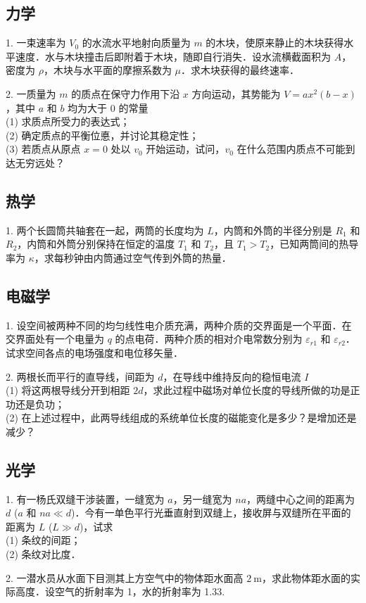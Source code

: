 \subsection{力学}
1. 一束速率为 $V_{0}$ 的水流水平地射向质量为 $m$ 的木块，使原来静止的木块获得水平速度．水与木块撞击后即附着于木块，随即自行消失．设水流横截面积为 $A$，密度为 $\rho$，木块与水平面的摩擦系数为 $\mu$．求木块获得的最终速率．

2. 一质量为 $m$ 的质点在保守力作用下沿 $x$ 方向运动，其势能为 $V=a x^{2}(b-x)$，其中 $a$ 和 $b$ 均为大于 0 的常量\\
(1) 求质点所受力的表达式；\\
(2) 确定质点的平衡位悳，并讨论其稳定性；\\
(3) 若质点从原点 $x=0$ 处以 $v_{0}$ 开始运动，试问，$v_{0}$ 在什么范围内质点不可能到达无穷远处？
\subsection{热学}
1. 两个长圆筒共轴套在一起，两筒的长度均为 $L$，内筒和外筒的半径分别是 $R_{1}$ 和 $R_{2}$，内筒和外筒分别保持在恒定的温度 $T_{1}$ 和 $T_{2}$，且 $T_{1}>T_{2}$，已知两筒间的热导率为 $\kappa$，求每秒钟由内筒通过空气传到外筒的热量．
\subsection{电磁学}
1. 设空间被两种不同的均匀线性电介质充满，两种介质的交界面是一个平面．在交界面处有一个电量为 $q$ 的点电荷．两种介质的相对介电常数分别为 $\varepsilon_{r 1}$ 和 $\varepsilon_{r 2}$．试求空间各点的电场强度和电位移矢量．

2. 两根长而平行的直导线，间距为 $d$，在导线中维持反向的稳恒电流 $I$\\
(1) 将这两根导线分开到相距 $2 d$，求此过程中磁场对单位长度的导线所做的功是正功还是负功；\\
(2) 在上述过程中，此两导线组成的系统单位长度的磁能变化是多少？是增加还是减少？
\subsection{光学}
1. 有一杨氏双缝干涉装置，一缝宽为 $a$，另一缝宽为 $na$，两缝中心之间的距离为 $d$ ($a$ 和 $na \ll d$)．今有一单色平行光垂直射到双缝上，接收屏与双缝所在平面的距离为 $L$ ($L \gg d$)，试求\\
(1) 条纹的间距；\\
(2) 条纹对比度．

2. 一潜水员从水面下目测其上方空气中的物体距水面高 $2 \mathrm{~m}$，求此物体距水面的实际高度．设空气的折射率为 1，水的折射率为 1.33.
